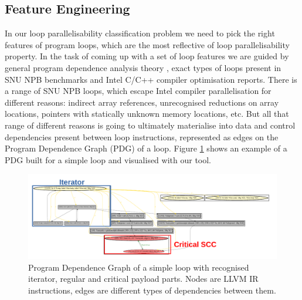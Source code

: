 \documentclass{acaces}
\begin{document}
\subsection{Feature Engineering}

\quad In our loop parallelisability classification problem we need to pick the right features of program loops, which are the most reflective of loop parallelisability property. In the task of coming up with a set of loop features we are guided by general program dependence analysis theory \cite{Kennedy:2001:OCM:502981}, exact types of loops present in SNU NPB benchmarks and Intel C/C++ compiler optimisation reports.\newline\null
\quad There is a range of SNU NPB loops, which escape Intel compiler parallelisation for different reasons: indirect array references, unrecognised reductions on array locations, pointers with statically unknown memory locations, etc. But all that range of different reasons is going to ultimately materialise into data and control dependencies present between loop instructions, represented as edges on the Program Dependence Graph (PDG) \cite{Ferrante:1987:PDG:24039.24041} of a loop. Figure \ref{fig:pdg} shows an example of a PDG built for a simple loop and visualised with our tool.\newline\null

\begin{figure}
\centering
\includegraphics[width=1.0\textwidth]{pdg_example}
\caption{Program Dependence Graph of a simple loop with recognised iterator, regular and critical payload parts. Nodes are LLVM IR instructions, edges are different types of dependencies between them.}
\label{fig:pdg}
\end{figure}
\end{document}
